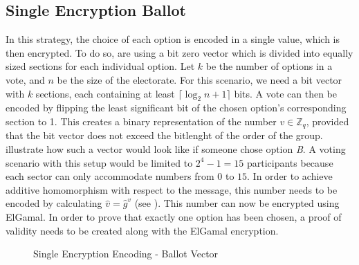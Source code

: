 \documentclass[numbers=noenddot, abstract=on, a4paper, headsepline,
footsepline, oneside, draft=off]{scrreprt}
\newcommand{\myref}[1]{(see \Vref{#1})}
\begin{document}
\subsection{Single Encryption Ballot}
In this strategy, the choice of each option is encoded in a single value, which
is then encrypted. To do so, are using a bit zero vector which is divided
into equally sized sections for each individual option. Let $k$ be the number of
options in a vote, and $n$ be the size of the electorate. For this scenario, we need a bit
vector with $k$ sections, each containing at least $\lceil\log_2 n+1\rceil$
bits.
A vote can then be encoded by flipping the least significant bit of the
chosen option's corresponding section to 1. This creates a binary representation
of the number $v \in \mathbb{Z}_q$, provided that the bit
vector does not exceed the bitlenght of the order of the group.
 illustrate how such a vector would look like
if someone chose option \emph{B}. A voting scenario with this setup would be
limited to $2^4-1=15$ participants because each sector can only accommodate
numbers from $0$ to $15$. In order to achieve additive homomorphism with respect
to the message, this number needs to be encoded by calculating $\hat{v}=\hat{g}^{v}$ \myref{sec:expelgamal}.
This number can now be encrypted using ElGamal. In order to prove that exactly one
option has been chosen, a proof of validity needs to be created along with the
ElGamal encryption.

 \begin{figure}[htbp]
	\centering
	\caption{Single Encryption Encoding - Ballot Vector}
	\label{fig:singleencryptionencoding}
\end{figure}
\end{document}
